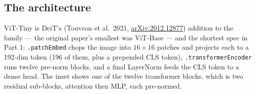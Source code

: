 \subsection*{The architecture}

ViT-Tiny is DeiT's (Touvron et al.\ 2021,
\href{https://arxiv.org/abs/2012.12877}{arXiv:2012.12877}) addition to
the family --- the original paper's smallest was ViT-Base --- and the
shortest spec in Part 1: \texttt{.patchEmbed} chops the
image into $16 \times 16$ patches and projects each to a 192-dim token
(196 of them, plus a prepended CLS token), \texttt{.transformerEncoder}
runs twelve pre-norm blocks, and a final LayerNorm feeds the CLS token
to a dense head. The inset shows one of the twelve transformer blocks,
which is two residual sub-blocks, attention then MLP, each pre-normed.

